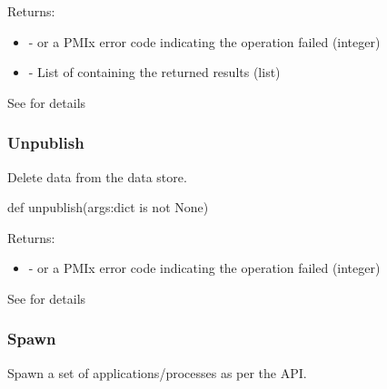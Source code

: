 Returns:
\begin{itemize}
    \item {} -  or a \ac{PMIx} error code indicating the operation failed (integer)
    \item {} - List of  containing the returned results (list)
\end{itemize}

See  for details


\subsubsection{Unpublish}

\summary

Delete data from the data store.

\format

\pyspecificstart
\begin{codepar}
def unpublish(args:dict is not None)
\end{codepar}
\pyspecificend

\begin{arglist}
\end{arglist}

Returns:
\begin{itemize}
    \item {} -  or a \ac{PMIx} error code indicating the operation failed (integer)
\end{itemize}

See  for details


\subsubsection{Spawn}

\summary

Spawn a set of applications/processes as per the  API.


